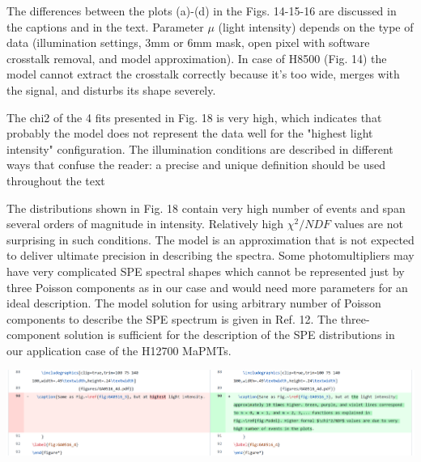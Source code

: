 \documentclass[11pt]{report}
\begin{document}
The differences between the plots (a)-(d) in the Figs. 14-15-16 are discussed in the captions and in the text.
Parameter $\mu$ (light intensity) depends on the type of data (illumination settings, 3mm or 6mm mask, open pixel with software crosstalk removal, and model approximation).
In case of H8500 (Fig. 14) the model cannot extract the crosstalk correctly because it's too wide, merges with the signal, and disturbs its shape severely.



\begin{tcolorbox}[enlarge top by=2em,colbacktitle=black!60!white,colframe=black!80!white,left=0pt,right=0pt,top=0pt,bottom=0pt,boxrule=0.3pt,title=\bfseries2.08]
The chi2 of the 4 fits presented in Fig. 18 is very high, which indicates that probably the model does not represent the data well for the "highest light intensity" configuration. The illumination conditions are described in different ways that confuse the reader: a precise and unique definition should be used throughout the text
\end{tcolorbox}

 The distributions shown in Fig. 18 contain very high number of events and span several orders of magnitude in intensity. Relatively high $\chi^2/NDF$ values are not surprising in such conditions. The model is an approximation that is not expected to deliver ultimate precision in describing the spectra. Some photomultipliers may have very complicated SPE spectral shapes which cannot be represented just by three Poisson components as in our case and would need more parameters for an ideal description. The model solution for using arbitrary number of Poisson components to describe the SPE spectrum is given in Ref. 12. The three-component solution is sufficient for the description of the SPE distributions in our application case of the H12700 MaPMTs.
 

\includegraphics[width=\linewidth]{round1/2.08.png}
\end{document}
